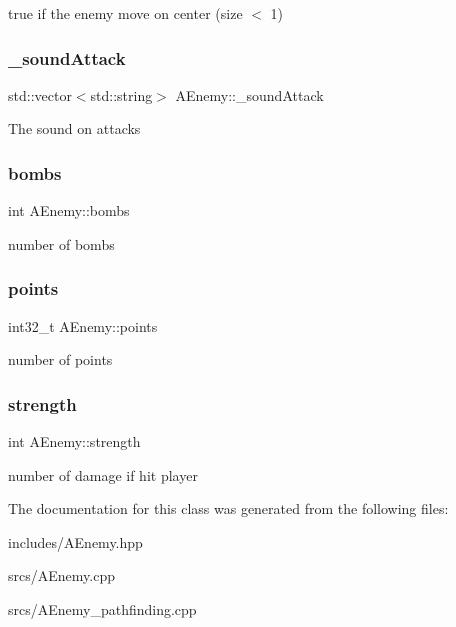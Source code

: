 true if the enemy move on center (size $<$ 1) \mbox{\label{class_a_enemy_a4b3d010b8630c401730fbee2bfeb2a6b}} 
\subsubsection{\texorpdfstring{\+\_\+sound\+Attack}{\_soundAttack}}
{\footnotesize\ttfamily std\+::vector$<$std\+::string$>$ A\+Enemy\+::\+\_\+sound\+Attack\hspace{0.3cm}{\ttfamily [protected]}}

The sound on attacks \mbox{\label{class_a_enemy_ac306e77e93cd7574766e04d17728d18a}} 
\subsubsection{\texorpdfstring{bombs}{bombs}}
{\footnotesize\ttfamily int A\+Enemy\+::bombs}

number of bombs \mbox{\label{class_a_enemy_a0d6c03c5f76b67b821f2510cc12dfc64}} 
\subsubsection{\texorpdfstring{points}{points}}
{\footnotesize\ttfamily int32\+\_\+t A\+Enemy\+::points}

number of points \mbox{\label{class_a_enemy_ac1bb9d347e62e478c9c83be27dcf1598}} 
\subsubsection{\texorpdfstring{strength}{strength}}
{\footnotesize\ttfamily int A\+Enemy\+::strength}

number of damage if hit player 

The documentation for this class was generated from the following files\+:\begin{DoxyCompactItemize}
\item 
includes/A\+Enemy.\+hpp\item 
srcs/A\+Enemy.\+cpp\item 
srcs/A\+Enemy\+\_\+pathfinding.\+cpp\end{DoxyCompactItemize}
